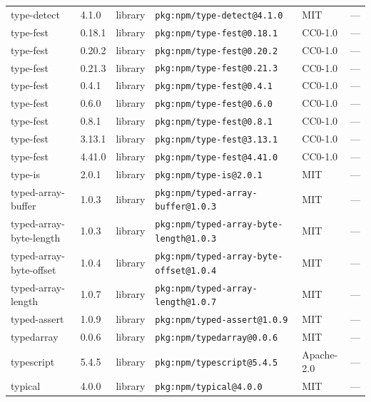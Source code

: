 \documentclass[11pt,a4paper]{article}
\begin{document}
\begin{longtable}{|p{4cm}|p{2cm}|p{1.6cm}|p{5cm}|p{1.5cm}|p{3.5cm}|}
\raggedright type-detect & 4.1.0 & library & \small\texttt{pkg:npm/type-detect@4.1.0} & MIT & \small — \\
\raggedright type-fest & 0.18.1 & library & \small\texttt{pkg:npm/type-fest@0.18.1} & CC0-1.0 & \small — \\
\raggedright type-fest & 0.20.2 & library & \small\texttt{pkg:npm/type-fest@0.20.2} & CC0-1.0 & \small — \\
\raggedright type-fest & 0.21.3 & library & \small\texttt{pkg:npm/type-fest@0.21.3} & CC0-1.0 & \small — \\
\raggedright type-fest & 0.4.1 & library & \small\texttt{pkg:npm/type-fest@0.4.1} & CC0-1.0 & \small — \\
\raggedright type-fest & 0.6.0 & library & \small\texttt{pkg:npm/type-fest@0.6.0} & CC0-1.0 & \small — \\
\raggedright type-fest & 0.8.1 & library & \small\texttt{pkg:npm/type-fest@0.8.1} & CC0-1.0 & \small — \\
\raggedright type-fest & 3.13.1 & library & \small\texttt{pkg:npm/type-fest@3.13.1} & CC0-1.0 & \small — \\
\raggedright type-fest & 4.41.0 & library & \small\texttt{pkg:npm/type-fest@4.41.0} & CC0-1.0 & \small — \\
\raggedright type-is & 2.0.1 & library & \small\texttt{pkg:npm/type-is@2.0.1} & MIT & \small — \\
\raggedright typed-array-buffer & 1.0.3 & library & \small\texttt{pkg:npm/typed-array-buffer@1.0.3} & MIT & \small — \\
\raggedright typed-array-byte-length & 1.0.3 & library & \small\texttt{pkg:npm/typed-array-byte-length@1.0.3} & MIT & \small — \\
\raggedright typed-array-byte-offset & 1.0.4 & library & \small\texttt{pkg:npm/typed-array-byte-offset@1.0.4} & MIT & \small — \\
\raggedright typed-array-length & 1.0.7 & library & \small\texttt{pkg:npm/typed-array-length@1.0.7} & MIT & \small — \\
\raggedright typed-assert & 1.0.9 & library & \small\texttt{pkg:npm/typed-assert@1.0.9} & MIT & \small — \\
\raggedright typedarray & 0.0.6 & library & \small\texttt{pkg:npm/typedarray@0.0.6} & MIT & \small — \\
\raggedright typescript & 5.4.5 & library & \small\texttt{pkg:npm/typescript@5.4.5} & Apache-2.0 & \small — \\
\raggedright typical & 4.0.0 & library & \small\texttt{pkg:npm/typical@4.0.0} & MIT & \small — \\

\end{longtable}
\end{document}
